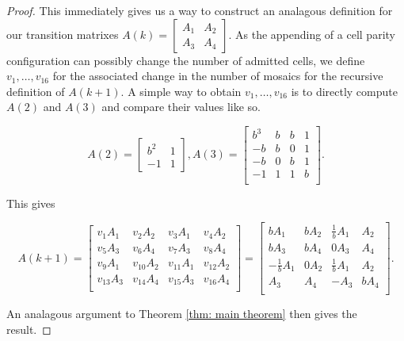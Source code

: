 \documentclass[12pt]{article}
\newtheorem{theorem}{Theorem}
\theoremstyle{plain}
\theoremstyle{definition}
\theoremstyle{remark}
\theoremstyle{definition}
\begin{document}
\begin{proof}
This immediately gives us a way to construct an analagous definition for our transition matrixes $A(k) = \begin{bmatrix} A_1 & A_2 \\ A_3 & A_4 \end{bmatrix}$. As the appending of a cell parity configuration can possibly change the number of admitted cells, we define $v_{1} ,\dots, v_{16}$ for the associated change in the number of mosaics for the recursive definition of $A(k+1)$. A simple way to obtain $v_{1} ,\dots, v_{16}$ is to directly compute $A(2)$ and $A(3)$ and compare their values like so.

$$A(2) = 
\begin{bmatrix}
    b^2 & 1 \\
    -1 & 1
\end{bmatrix}, A(3)=
\begin{bmatrix}
b^3 & b & b & 1 \\
-b & b & 0 & 1 \\
-b & 0 & b & 1 \\
-1 & 1 & 1 & b \\
\end{bmatrix}.$$

This gives

$$
A(k+1) = 
\begin{bmatrix}
    v_{1}A_1 & v_{2}A_2 & v_{3}A_1 & v_{4}A_2 \\
    v_{5}A_3 & v_{6}A_4 & v_{7}A_3 & v_{8}A_4 \\
    v_{9}A_1 & v_{10}A_2 & v_{11}A_1 & v_{12}A_2 \\
    v_{13}A_3 & v_{14}A_4 & v_{15}A_3 & v_{16}A_4 \\
\end{bmatrix} =
\begin{bmatrix}
bA_1 & bA_2 & \frac{1}{b}A_1 & A_2 \\
bA_3 & bA_4 & 0A_3 & A_4 \\
-\frac{1}{b}A_1 & 0A_2 & \frac{1}{b}A_1 & A_2 \\
A_3 & A_4 & -A_3 & bA_4 \\
\end{bmatrix}.
$$

An analagous argument to Theorem \ref{thm: main theorem} then gives the result.

\end{proof}

\end{document}
